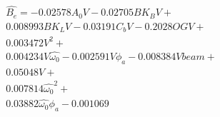 \begin{equation} \label{eq:polynom_complex}
\begin{aligned} 
 \hat{B_{e}} = - 0.02578 A_{0} V - 0.02705 BK_{B} V + \\ 
 0.008993 BK_{L} V - 0.03191 C_{b} V - 0.2028 OG V + \\ 
 0.003472 V^{2} + \\ 
 0.004234 V \hat{\omega_{0}} - 0.002591 V \phi_{a} - 0.008384 V beam + \\ 
 0.05048 V + \\ 
 0.007814 \hat{\omega_{0}}^{2} + \\ 
 0.03882 \hat{\omega_{0}} \phi_{a} - 0.001069 \\ 
 \end{aligned}
\end{equation}
